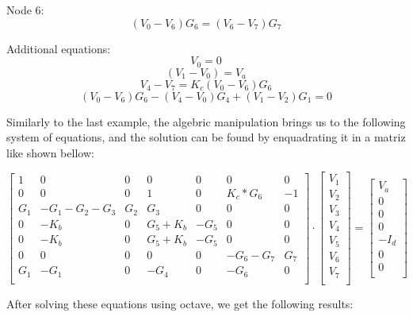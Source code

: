 Node 6:
$$ (V_0 - V_6)G_6 = (V_6 - V_7)G_7 $$

Additional equations:
$$ V_0 = 0 $$
$$ (V_1 - V_0) = V_a $$
$$ V_4 - V_7 = K_c(V_0 - V_6)G_6$$
$$ (V_0 -V_6)G_6 - (V_4 - V_0)G_4 + (V_1 - V_2)G_1 = 0 $$

\vspace{0.5cm}

Similarly to the last example, the algebric manipulation brings us to the following system of equations, 
and the solution can be found by enquadrating it in a matriz like shown bellow:

\[
\begin{bmatrix}
1 & 0 & 0 & 0 & 0 & 0 & 0\\
0 & 0 & 0 & 1 & 0 & K_c * G_6 & -1\\
G_1 & -G_1-G_2 - G_3 & G_2 & G_3 & 0 & 0 & 0\\
0 & -K_b & 0 & G_5 + K_b & -G_5 & 0 & 0\\
0 & -K_b & 0 & G_5 + K_b & -G_5 & 0 & 0\\
0 & 0 & 0 & 0 & 0 & -G_6-G_7 & G_7\\
G_1 & -G_1 & 0 & -G_4 & 0 & -G_6 & 0\\
\end{bmatrix}
\cdot
\begin{bmatrix}
V_1\\
V_2\\
V_3\\
V_4\\
V_5\\
V_6\\
V_7\\
\end{bmatrix}
=
\begin{bmatrix}
V_a\\
0\\
0\\
0\\
-I_d\\
0\\
0\\
\end{bmatrix}
\]

\vspace{0.5cm}

After solving these equations using octave, we get 
the following results:

\vspace{0.5cm}


\vspace{1.0cm}

